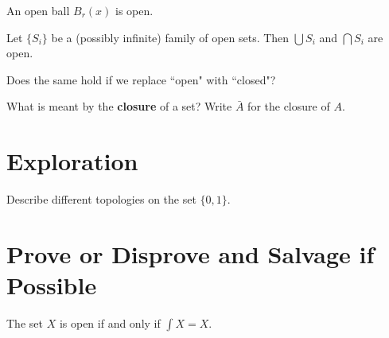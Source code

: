 \documentclass{homework}
\begin{document}
\begin{problem}
  An open ball $B_r(x)$ is open.
\end{problem}

\begin{problem}
  Let $\{S_i\}$ be a (possibly infinite) family of open sets. Then $\bigcup S_i$ and $\bigcap S_i$ are open.

  Does the same hold if we replace ``open" with ``closed"?
\end{problem}

\begin{problem}
  What is meant by the \textbf{closure} of a set?  Write $\bar{A}$ for the closure of $A$.
\end{problem}


\section{Exploration}

\begin{problem}
  Describe different topologies on the set $\{ 0, 1 \}$.
\end{problem}

\section{Prove or Disprove and Salvage if Possible}

\begin{problem}
  The set $X$ is open if and only if $\int X = X$.
\end{problem}
\end{document}
